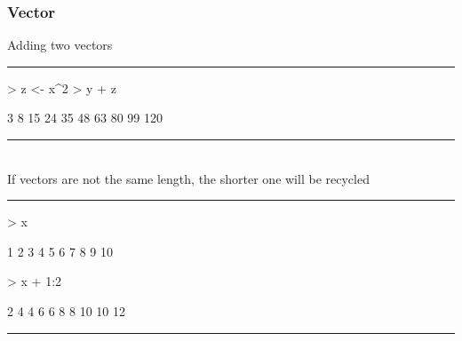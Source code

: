 \documentclass{beamer}
\begin{document}
\begin{frame}[fragile]
	\frametitle{Vector}
	Adding two vectors\\
\rule{\textwidth}{0.4pt}
\begin{Schunk}
\begin{Sinput}
> z <- x^2
> y + z
\end{Sinput}
\begin{Soutput}
 [1]   3   8  15  24  35  48  63  80  99 120
\end{Soutput}
\end{Schunk}
  \rule{\textwidth}{0.4pt}\\
  \vspace{20pt}
  If vectors are not the same length, the shorter one will be recycled\\
  \rule{\textwidth}{0.4pt}
\begin{Schunk}
\begin{Sinput}
> x
\end{Sinput}
\begin{Soutput}
 [1]  1  2  3  4  5  6  7  8  9 10
\end{Soutput}
\begin{Sinput}
> x + 1:2
\end{Sinput}
\begin{Soutput}
 [1]  2  4  4  6  6  8  8 10 10 12
\end{Soutput}
\end{Schunk}
  \rule{\textwidth}{0.4pt}
\end{frame}
\end{document}
